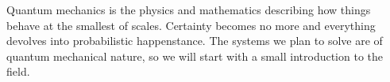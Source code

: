 Quantum mechanics is the physics and mathematics describing how things behave at the smallest of scales. Certainty becomes no more and everything devolves into probabilistic happenstance. The systems we plan to solve are of quantum mechanical nature, so we will start with a small introduction to the field.



